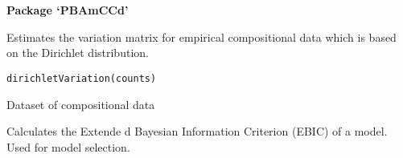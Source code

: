 \documentclass[a4paper]{book}
\begin{document}
\chapter*{}
\begin{center}
{\textbf{\huge Package `PBAmCCd'}}
\par\bigskip{\large \today}
\end{center}
\begin{description}
\raggedright{}
\item[Type]
\item[Title]
\item[Author]
\item[Maintainer]\AsIs{}
\item[Description]
\item[License]
\item[Version]
\item[RoxygenNote]
\end{description}
%
\begin{Description}\relax
Estimates the variation matrix for empirical compositional data which is based
on the Dirichlet distribution.
\end{Description}
%
\begin{Usage}
\begin{verbatim}
dirichletVariation(counts)
\end{verbatim}
\end{Usage}
%
\begin{Arguments}
\begin{ldescription}
\item[\code{counts}] Dataset of compositional data
\end{ldescription}
\end{Arguments}
%
\begin{Value}
\end{Value}
%
\begin{Description}\relax
Calculates the Extende
d Bayesian Information Criterion (EBIC) of a model.
Used for model selection.
\end{Description}
\end{document}
